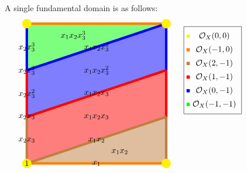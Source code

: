 \documentclass{amsart}
\begin{document}
\begin{example}
\begin{figure}
  A single fundamental domain is as follows:
\[
\begin{tikzpicture}[scale=2]
\fill[opacity=0.5, green] (0,2) -- (0,3) -- (3,3) -- cycle;
\fill[opacity=0.5, blue] (0,1) -- (0,2) -- (3,3) -- (3,2) -- (0,1);
\fill[opacity=0.5, red] (0,0) -- (0,1) -- (3,2) -- (3,1) -- (0,0);
\fill[opacity=0.5, brown] (0,0) -- (3,1) -- (3,0) -- (0,0);

\draw[line width=3pt, brown] (0,0) -- (0,1);
\draw[line width=3pt, red] (0,1) -- (0,2);
\draw[line width=3pt, blue] (0,2)-- (0,3);
\draw[line width=3pt, orange] (0,3) -- (3,3);

\draw[line width=3pt, brown] (3,0) -- (3,1);
\draw[line width=3pt, red] (3,1) -- (3,2);
\draw[line width=3pt, blue] (3,2)-- (3,3);


\draw[line width=3pt, orange] (3,0) -- (0,0);
\draw[line width=3pt, brown] (0,0) -- (3,1);
\draw[line width=3pt, red] (0,1) -- (3,2);
\draw[line width=3pt, blue] (0,2) -- (3,3);


\node[fill, circle, yellow, inner sep = 4pt] at (0,0) {};
\node[fill, circle, yellow, inner sep = 4pt] at (3,0) {};
\node[fill, circle, yellow, inner sep = 4pt] at (3,3) {};
\node[fill, circle, yellow, inner sep = 4pt] at (0,3) {};
\node at (0,0) {$1$};
\node at (0,1) {$x_2x_3$};
\node at (0,2) {$x_2x_3^2$};

\node at (1.5,0) {$x_1$};

\node at (0,0.5) {$x_2x_3$};
\node at (0,1.5) {$x_2x_3^2$};
\node at (0,2.5) {$x_2x_3^3$};


\node at (1.5,0.5) {$x_1x_2$};
\node at (1.5,1.5) {$x_1x_2x_3$};
\node at (1.5,2.5) {$x_1x_2x_3^2$};

\node at (2,0.25) {$x_1x_2$};
\node at (1.5,1) {$x_1x_2x_3$};
\node at (1.5,2) {$x_1x_2x_3^2$};
\node at (1,2.75) {$x_1x_2x_3^3$};

\matrix[draw] at (4,2) {
  \node[fill=yellow,inner sep = 2pt] {}; & \node {$\cO_{X}(0,0)$};\\
  \node[fill=orange,inner sep = 2pt] {}; & \node {$\cO_{X}(-1,0)$};\\
  \node[fill=brown,inner sep = 2pt] {}; & \node {$\cO_{X}(2,-1)$};\\
  \node[fill=red,inner sep = 2pt] {}; & \node {$\cO_{X}(1,-1)$};\\
  \node[fill=blue,inner sep = 2pt] {}; & \node {$\cO_{X}(0,-1)$};\\
  \node[fill=green,inner sep = 2pt] {}; & \node {$\cO_{X}(-1,-1)$};\\
};


\end{tikzpicture}\]
\end{figure}
\end{example}
\end{document}
